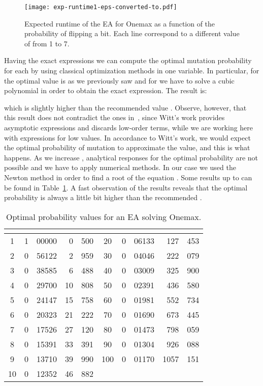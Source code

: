 \documentclass{article}
\begin{document}
\begin{figure}[!ht]
\centering
\texttt{[image: exp-runtime1-eps-converted-to.pdf]}
\caption{Expected runtime of the  EA for Onemax as a function of the probability of flipping a bit. Each line correspond to a different value of  from 1 to 7.}
\label{fig:onemax}
\end{figure}

Having the exact expressions we can compute the optimal mutation probability for each  by using classical optimization methods in one variable. In particular, for  the optimal value is  as we previously saw and for  we have to solve a cubic polynomial in order to obtain the exact expression. The result is:

which is slightly higher than the recommended value . Observe, however, that this result does not contradict the ones in~\cite{Witt2013tight}, since Witt's work provides asymptotic expressions and discards low-order terms, while we are working here with expressions for low  values. In accordance to Witt's work, we would expect the optimal probability of mutation  to approximate the  value, and this is what happens.
As we increase , analytical responses for the optimal probability are not possible and we have to apply numerical methods. In our case we used the Newton method in order to find a root of the equation . Some results up to  can be found in Table~\ref{tab:optimal-p}. A fast observation of the results reveals that the optimal probability is always a little bit higher than the recommended .








\begin{table}[!ht]
\begin{center}
\begin{tabular}{|cr@{.}lr@{.}l||cr@{.}lr@{.}l|}
\hline
 
& \multicolumn{2}{c}{} 
& \multicolumn{2}{c||}{} 
&  
& \multicolumn{2}{c}{} 
& \multicolumn{2}{c|}{}  \\
\hline
1 & 1&00000 & 0&500 & 20 & 0&06133 & 127&453 \\
2 & 0&56122 & 2&959 & 30 & 0&04046 & 222&079 \\
3 & 0&38585 & 6&488 & 40 & 0&03009 & 325&900 \\
4 & 0&29700 & 10&808 & 50 & 0&02391 & 436&580 \\
5 & 0&24147 & 15&758 & 60 & 0&01981 & 552&734 \\
6 & 0&20323 & 21&222 & 70 & 0&01690 & 673&445 \\
7 & 0&17526 & 27&120 & 80 & 0&01473 & 798&059 \\
8 & 0&15391 & 33&391 & 90 & 0&01304 & 926&088 \\
9 & 0&13710 & 39&990 & 100 & 0&01170 & 1057&151 \\
10 & 0&12352 & 46&882 &    &  \multicolumn{2}{c}{~} &      \multicolumn{2}{c|}{~}         \\
\hline 
\end{tabular}
\end{center}
\caption{Optimal probability values for an  EA solving Onemax.}
\label{tab:optimal-p}
\end{table}
\end{document}
